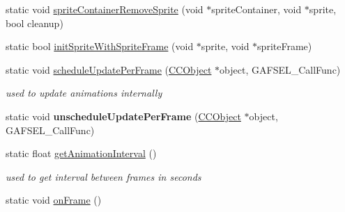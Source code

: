 \begin{DoxyCompactItemize}
\item 
static void \hyperlink{class_g_a_f_1_1_g_a_f_marmalade_g_f_x_a9834611e200459c3d0029caf080efd33}{sprite\-Container\-Remove\-Sprite} (void $\ast$sprite\-Container, void $\ast$sprite, bool cleanup)
\item 
static bool \hyperlink{class_g_a_f_1_1_g_a_f_marmalade_g_f_x_a948922dd8b7b9ae7bf4854cb81427ea4}{init\-Sprite\-With\-Sprite\-Frame} (void $\ast$sprite, void $\ast$sprite\-Frame)
\item 
\hypertarget{class_g_a_f_1_1_g_a_f_marmalade_g_f_x_acbe20a989f371ede8c045280f42d0b6d}{static void \hyperlink{class_g_a_f_1_1_g_a_f_marmalade_g_f_x_acbe20a989f371ede8c045280f42d0b6d}{schedule\-Update\-Per\-Frame} (\hyperlink{class_g_a_f_1_1_c_c_object}{C\-C\-Object} $\ast$object, G\-A\-F\-S\-E\-L\-\_\-\-Call\-Func)}\label{class_g_a_f_1_1_g_a_f_marmalade_g_f_x_acbe20a989f371ede8c045280f42d0b6d}

\begin{DoxyCompactList}\small\item\em used to update animations internally \end{DoxyCompactList}\item 
\hypertarget{class_g_a_f_1_1_g_a_f_marmalade_g_f_x_a85b396b19691358b7b1318eb65ed9c7a}{static void {\bfseries unschedule\-Update\-Per\-Frame} (\hyperlink{class_g_a_f_1_1_c_c_object}{C\-C\-Object} $\ast$object, G\-A\-F\-S\-E\-L\-\_\-\-Call\-Func)}\label{class_g_a_f_1_1_g_a_f_marmalade_g_f_x_a85b396b19691358b7b1318eb65ed9c7a}

\item 
\hypertarget{class_g_a_f_1_1_g_a_f_marmalade_g_f_x_a29a77c913497ddef3396f1e430ba428e}{static float \hyperlink{class_g_a_f_1_1_g_a_f_marmalade_g_f_x_a29a77c913497ddef3396f1e430ba428e}{get\-Animation\-Interval} ()}\label{class_g_a_f_1_1_g_a_f_marmalade_g_f_x_a29a77c913497ddef3396f1e430ba428e}

\begin{DoxyCompactList}\small\item\em used to get interval between frames in seconds \end{DoxyCompactList}\item 
static void \hyperlink{class_g_a_f_1_1_g_a_f_marmalade_g_f_x_a1c70fe78be6ca6ec191b38aa91c5fa44}{on\-Frame} ()
\end{DoxyCompactItemize}


